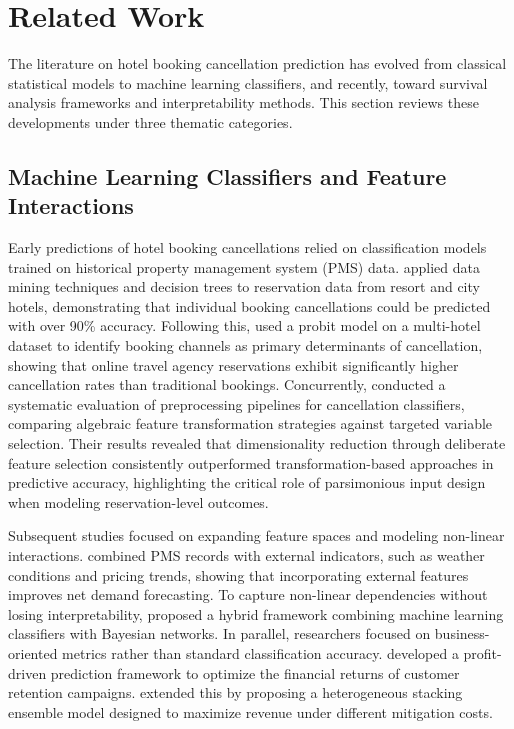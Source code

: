 \documentclass[pdflatex,sn-mathphys-ay]{sn-jnl}%
\theoremstyle{thmstyleone}%
\theoremstyle{thmstyletwo}%
\theoremstyle{thmstylethree}%
\begin{document}
\section{Related Work}
\label{sec:related_work}

The literature on hotel booking cancellation prediction has evolved from classical statistical models to machine learning classifiers, and recently, toward survival analysis frameworks and interpretability methods. This section reviews these developments under three thematic categories.

\subsection{Machine Learning Classifiers and Feature Interactions}
Early predictions of hotel booking cancellations relied on classification models trained on historical property management system (PMS) data. \cite{antonio2017predicting} applied data mining techniques and decision trees to reservation data from resort and city hotels, demonstrating that individual booking cancellations could be predicted with over 90\% accuracy. Following this, \cite{falk2018modelling} used a probit model on a multi-hotel dataset to identify booking channels as primary determinants of cancellation, showing that online travel agency reservations exhibit significantly higher cancellation rates than traditional bookings. Concurrently, \cite{satu2020performance} conducted a systematic evaluation of preprocessing pipelines for cancellation classifiers, comparing algebraic feature transformation strategies against targeted variable selection. Their results revealed that dimensionality reduction through deliberate feature selection consistently outperformed transformation-based approaches in predictive accuracy, highlighting the critical role of parsimonious input design when modeling reservation-level outcomes.

Subsequent studies focused on expanding feature spaces and modeling non-linear interactions. \cite{antonio2019big} combined PMS records with external indicators, such as weather conditions and pricing trends, showing that incorporating external features improves net demand forecasting. To capture non-linear dependencies without losing interpretability, \cite{chen2023prediction} proposed a hybrid framework combining machine learning classifiers with Bayesian networks. In parallel, researchers focused on business-oriented metrics rather than standard classification accuracy. \cite{liu2023hospitality} developed a profit-driven prediction framework to optimize the financial returns of customer retention campaigns. \cite{liu2025explainable} extended this by proposing a heterogeneous stacking ensemble model designed to maximize revenue under different mitigation costs.
\end{document}
